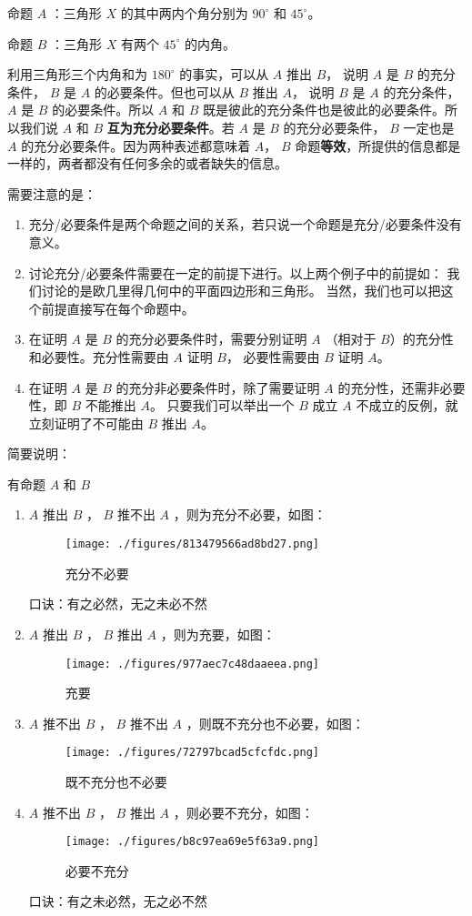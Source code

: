\begin{example}{}
命题 $A$ ：三角形 $X$ 的其中两内个角分别为 $90^\circ$ 和 $45^\circ$。

命题 $B$ ：三角形 $X$ 有两个 $45^\circ$ 的内角。

利用三角形三个内角和为 $180^\circ$ 的事实，可以从 $A$ 推出 $B$， 说明 $A$ 是 $B$ 的充分条件， $B$ 是 $A$ 的必要条件。但也可以从 $B$ 推出 $A$， 说明 $B$ 是 $A$ 的充分条件， $A$ 是 $B$ 的必要条件。所以 $A$ 和 $B$ 既是彼此的充分条件也是彼此的必要条件。所以我们说 $A$ 和 $B$ \textbf{互为充分必要条件}。若 $A$ 是 $B$ 的充分必要条件， $B$ 一定也是 $A$ 的充分必要条件。因为两种表述都意味着 $A$，  $B$ 命题\textbf{等效}，所提供的信息都是一样的，两者都没有任何多余的或者缺失的信息。
\end{example}

需要注意的是：
\begin{enumerate}
\item 充分/必要条件是两个命题之间的关系，若只说一个命题是充分/必要条件没有意义。
\item 讨论充分/必要条件需要在一定的前提下进行。以上两个例子中的前提如： 我们讨论的是欧几里得几何中的平面四边形和三角形。 当然，我们也可以把这个前提直接写在每个命题中。
\item 在证明 $A$ 是 $B$ 的充分必要条件时，需要分别证明 $A$ （相对于 $B$）的充分性和必要性。充分性需要由 $A$ 证明 $B$， 必要性需要由 $B$ 证明 $A$。 
\item 在证明 $A$ 是 $B$ 的充分非必要条件时，除了需要证明 $A$ 的充分性，还需非必要性，即 $B$ 不能推出 $A$。 只要我们可以举出一个 $B$ 成立 $A$ 不成立的反例，就立刻证明了不可能由 $B$ 推出 $A$。 
\end{enumerate}

简要说明：

有命题 $A$ 和 $B$ 
\begin{enumerate}
\item $A$ 推出 $B$ ， $B$ 推不出 $A$ ，则为充分不必要，如图：
\begin{figure}[ht]
\centering
\texttt{[image: ./figures/813479566ad8bd27.png]}
\caption{充分不必要} \label{fig_SufCnd_2}
\end{figure}
口诀：有之必然，无之未必不然
\item $A$ 推出 $B$ ， $B$ 推出 $A$ ，则为充要，如图：\begin{figure}[ht]
\centering
\texttt{[image: ./figures/977aec7c48daaeea.png]}
\caption{充要} \label{fig_SufCnd_3}
\end{figure}
\item $A$ 推不出 $B$ ， $B$ 推不出 $A$ ，则既不充分也不必要，如图：\begin{figure}[ht]
\centering
\texttt{[image: ./figures/72797bcad5cfcfdc.png]}
\caption{既不充分也不必要} \label{fig_SufCnd_4}
\end{figure}
\item $A$ 推不出 $B$ ， $B$ 推出 $A$ ，则必要不充分，如图：\begin{figure}[ht]
\centering
\texttt{[image: ./figures/b8c97ea69e5f63a9.png]}
\caption{必要不充分} \label{fig_SufCnd_5}
\end{figure}
口诀：有之未必然，无之必不然
\end {enumerate}

